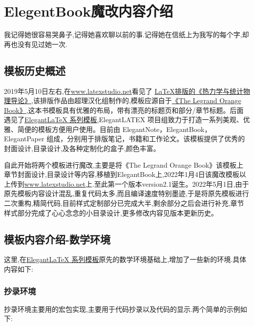 \chapter{ElegentBook魔改内容介绍}
\begin{center}
    \textcolor[RGB]{255, 0, 0}{\faHeart}我记得她很容易哭鼻子,记得她喜欢聊以前的事.记得她在信纸上为我写的每个字,却再也没有见过她一次.\textcolor[RGB]{255, 0, 0}{\faHeart}
\end{center}
\vspace{-5pt}
\begin{center}
\end{center}

\section{模板历史概述}
2019年5月10日左右,在\href{latexstudio论坛}{www.latexstudio.net}看见了
\href{https://www.latexstudio.net/archives/10715.html}{LaTeX排版的《热力学与统计物理导论》},该排版作品由超理汉化组制作的,模板应源自于\href{http://www.latextemplates.com/template/the-legrand-orange-book}{《The Legrand Orange Book》},这本书模板具有优雅的布局，带有漂亮的标题页和部分/章节标题。后面遇见了\href{https://elegantlatex.org/}{Elegant\LaTeX{} 系列模板},ElegantLATEX 项目组致力于打造一系列美观、优雅、简便的模板方便用户使用。目前由
ElegantNote，ElegantBook，ElegantPaper 组成，分别用于排版笔记，书籍和工作论文。该模板提供了优秀的封面设计,目录设计,及各种定制化的盒子,颜色丰富。

自此开始将两个模板进行魔改,主要是将《The Legrand Orange Book》该模板上章节封面设计,目录设计等内容,移植到ElegantBook上,2022年1月4日该魔改模板以上传到\href{latexstudio论坛}{www.latexstudio.net}上.至此第一个版本version2.1诞生。2022年5月1日,由于原先模板内容设计混乱,重复代码太多,而且编译速度特别墨迹,于是将原先模板进行二次重构,精简代码,目前样式定制部分已完成大半,剩余部分之后会进行补充,章节样式部分完成了心心念念的小目录设计,更多修改内容见版本更新历史。

\section{模板内容介绍-数学环境}
这里,在\href{https://elegantlatex.org/}{Elegant\LaTeX{} 系列模板}原先的数学环境基础上,增加了一些新的环境.具体内容如下:

\subsection{抄录环境}
抄录环境主要用的宏包实现,主要用于代码抄录以及代码的显示.两个简单的示例如下:

